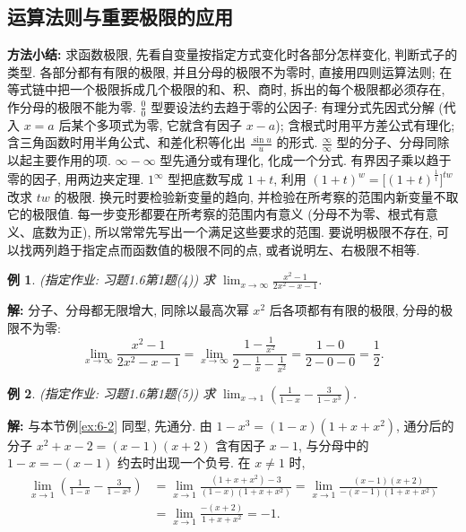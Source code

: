 \documentclass[UTF8,openany]{ctexbook}
\theoremstyle{chinesetextbook}
\newtheorem{example}{例}[section]
\newenvironment{cnsolution}{\par\indent\textbf{解:} \ignorespaces}{\par}
\begin{document}
\subsection{运算法则与重要极限的应用}
\par\indent\textbf{方法小结:} 求函数极限, 先看自变量按指定方式变化时各部分怎样变化, 判断式子的类型. 各部分都有有限的极限, 并且分母的极限不为零时, 直接用四则运算法则; 在等式链中把一个极限拆成几个极限的和、积、商时, 拆出的每个极限都必须存在, 作分母的极限不能为零. $\displaystyle\frac00$ 型要设法约去趋于零的公因子: 有理分式先因式分解 (代入 $x=a$ 后某个多项式为零, 它就含有因子 $x-a$); 含根式时用平方差公式有理化; 含三角函数时用半角公式、和差化积等化出 $\displaystyle\frac{\sin u}u$ 的形式. $\displaystyle\frac\infty\infty$ 型的分子、分母同除以起主要作用的项. $\infty-\infty$ 型先通分或有理化, 化成一个分式. 有界因子乘以趋于零的因子, 用两边夹定理. $1^\infty$ 型把底数写成 $1+t$, 利用 $(1+t)^w=\bigl[(1+t)^{\frac1t}\bigr]^{tw}$ 改求 $tw$ 的极限. 换元时要检验新变量的趋向, 并检验在所考察的范围内新变量不取它的极限值. 每一步变形都要在所考察的范围内有意义 (分母不为零、根式有意义、底数为正), 所以常常先写出一个满足这些要求的范围. 要说明极限不存在, 可以找两列趋于指定点而函数值的极限不同的点, 或者说明左、右极限不相等.
\begin{example}
\textnormal{(指定作业: 习题1.6第1题(4))} 求 $\displaystyle\lim_{x\to\infty}\frac{x^2-1}{2x^2-x-1}$.
\end{example}
\begin{cnsolution}
分子、分母都无限增大, 同除以最高次幂 $x^2$ 后各项都有有限的极限, 分母的极限不为零:
\[
\lim_{x\to\infty}\frac{x^2-1}{2x^2-x-1}=\lim_{x\to\infty}\frac{1-\frac1{x^2}}{2-\frac1x-\frac1{x^2}}=\frac{1-0}{2-0-0}=\frac12.
\]
\end{cnsolution}
\begin{example}
\textnormal{(指定作业: 习题1.6第1题(5))} 求 $\displaystyle\lim_{x\to1}\left(\frac1{1-x}-\frac3{1-x^3}\right)$.
\end{example}
\begin{cnsolution}
与本节例\ref{ex:6-2} 同型, 先通分. 由 $1-x^3=(1-x)(1+x+x^2)$, 通分后的分子 $x^2+x-2=(x-1)(x+2)$ 含有因子 $x-1$, 与分母中的 $1-x=-(x-1)$ 约去时出现一个负号. 在 $x\ne1$ 时,
\[
\begin{aligned}
\lim_{x\to1}\left(\frac1{1-x}-\frac3{1-x^3}\right)
&=\lim_{x\to1}\frac{(1+x+x^2)-3}{(1-x)(1+x+x^2)}=\lim_{x\to1}\frac{(x-1)(x+2)}{-(x-1)(1+x+x^2)}\\
&=\lim_{x\to1}\frac{-(x+2)}{1+x+x^2}=-1.
\end{aligned}
\]
\end{cnsolution}
\end{document}
